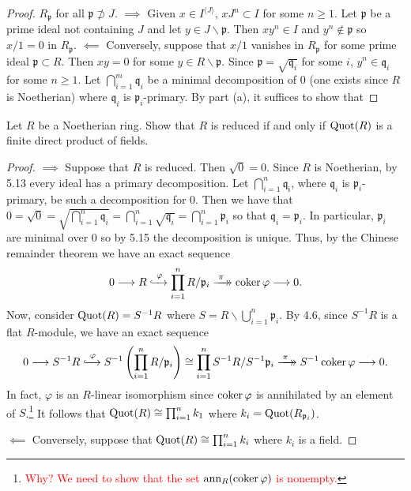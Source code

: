 \begin{proof}
$R_{\mathfrak{p}}$ for all $\mathfrak{p}\nsupset J$. $\implies$
Given $x\in I^{\langle J\rangle}$, $xJ^n\subset I$ for some
$n\geq 1$. Let $\mathfrak{p}$ be a prime ideal not containing $J$
and let $y\in J\smallsetminus\mathfrak{p}$. Then $xy^n\in I$ and
$y^n\notin\mathfrak{p}$ so $x/1=0$ in
$R_{\mathfrak{p}}$. $\impliedby$ Conversely, suppose that $x/1$
vanishes in $R_{\mathfrak{p}}$ for some prime ideal
$\mathfrak{p}\subset R$. Then $xy=0$ for some
$y\in R\smallsetminus\mathfrak{p}$. Since
$\mathfrak{p}=\sqrt{\mathfrak{q}_i}$ for some $i$,
$y^n\in\mathfrak{q}_i$ for some $n\geq 1$. Let
$\bigcap_{i=1}^m\mathfrak{q}_i$ be a minimal decomposition of $0$
(one exists since $R$ is Noetherian) where $\mathfrak{q}_i$ is
$\mathfrak{p}_i$-primary. By part (a), it suffices to show that
\end{proof}
\newpage
\begin{problem}
Let $R$ be a Noetherian ring. Show that $R$ is reduced if and
only if $\operatorname{Quot}(R)$ is a finite direct product of fields.
\end{problem}
\begin{proof}
$\implies$ Suppose that $R$ is reduced. Then $\sqrt{0}=0$. Since
$R$ is Noetherian, by 5.13 every ideal has a primary
decomposition. Let $\bigcap_{i=1}^n\mathfrak{q_i}$, where
$\mathfrak{q}_i$ is $\mathfrak{p}_i$-primary, be such a
decomposition for $0$. Then we have that
$0=\sqrt{0}=\sqrt{\bigcap_{i=1}^n\mathfrak{q}_i}=\bigcap_{i=1}^n\sqrt{\mathfrak{q}_i}=\bigcap_{i=1}^n\mathfrak{p}_i$
so that $\mathfrak{q}_i=\mathfrak{p}_i$. In particular,
$\mathfrak{p}_i$ are minimal over $0$ so by 5.15 the
decomposition is unique. Thus, by the Chinese remainder theorem
we have an exact sequence
\[
0
\longrightarrow
R
\xhookrightarrow{\;\varphi\;}
\prod_{i=1}^n R/\mathfrak{p}_i
\xtwoheadrightarrow{\;\pi\;}
\coker\varphi
\longrightarrow
0.
\]
Now, consider
$\operatorname{Quot}(R)=S^{-1}R$ where
$S=R\smallsetminus\bigcup_{i=1}^n\mathfrak{p}_i$. By 4.6, since
$S^{-1}R$ is a flat $R$-module, we have an exact sequence
\[
0
\longrightarrow
S^{-1}R
\xhookrightarrow{\;\varphi\;}
S^{-1}\left(\prod_{i=1}^nR/\mathfrak{p}_i\right)
\cong
\prod_{i=1}^nS^{-1}R/S^{-1}\mathfrak{p}_i
\xtwoheadrightarrow{\;\pi\;}
S^{-1}\coker\varphi
\longrightarrow
0
.
\]
In fact, $\varphi$ is an $R$-linear isomorphism since $\operatorname{coker}\varphi$
is annihilated by an element of
$S$.\footnote{\textcolor{Red}{Why? We need to show that the set
$\operatorname{ann}_R(\operatorname{coker}\varphi)$ is nonempty.}}
It follows that $\operatorname{Quot}(R)\cong \prod_{i=1}^n k_1$ where
$k_i=\operatorname{Quot}(R_{\mathfrak{p}_i})$.

$\impliedby$ Conversely, suppose that $\operatorname{Quot}(R)\cong\prod_{i=1}^n
k_i$ where $k_i$ is a field.
\end{proof}

